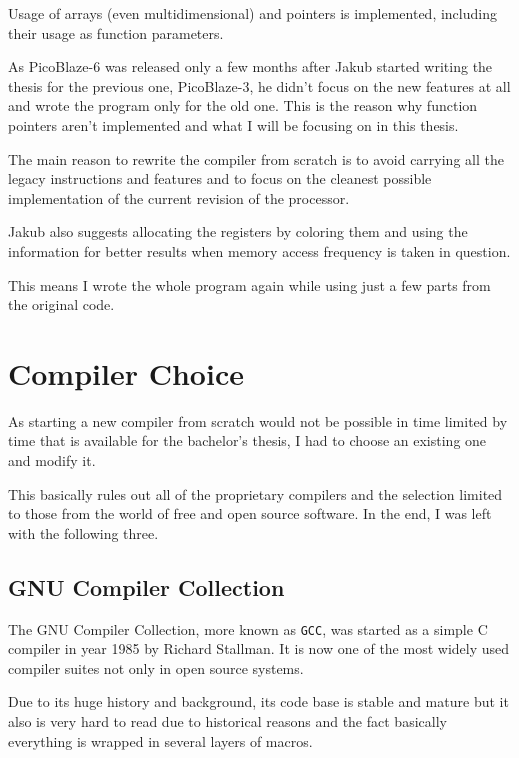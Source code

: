     Usage of arrays (even multidimensional) and pointers is implemented, including their usage as function parameters.

    As PicoBlaze-6 was released only a few months after Jakub started writing the thesis for the previous one, PicoBlaze-3, he didn't focus on the new features at all and wrote the program only for the old one. This is the reason why function pointers aren't implemented and what I will be focusing on in this thesis.

    The main reason to rewrite the compiler from scratch is to avoid carrying all the legacy instructions and features and to focus on the cleanest possible implementation of the current revision of the processor.

    Jakub also suggests allocating the registers by coloring them and using the information for better results when memory access frequency is taken in question.

    This means I wrote the whole program again while using just a few parts from the original code.

\chapter{Compiler Choice}\label{compiler}

As starting a new compiler from scratch would not be possible in time limited by time that is available for the bachelor's thesis, I had to choose an existing one and modify it.

This basically rules out all of the proprietary compilers and the selection limited to those from the world of free and open source software. In the end, I was left with the following three.


    \section{GNU Compiler Collection}

    The GNU Compiler Collection, more known as \texttt{GCC}, was started as a simple C compiler in year 1985 by Richard Stallman. It is now one of the most widely used compiler suites not only in open source systems.

    Due to its huge history and background, its code base is stable and mature but it also is very hard to read due to historical reasons and the fact basically everything is wrapped in several layers of macros.

